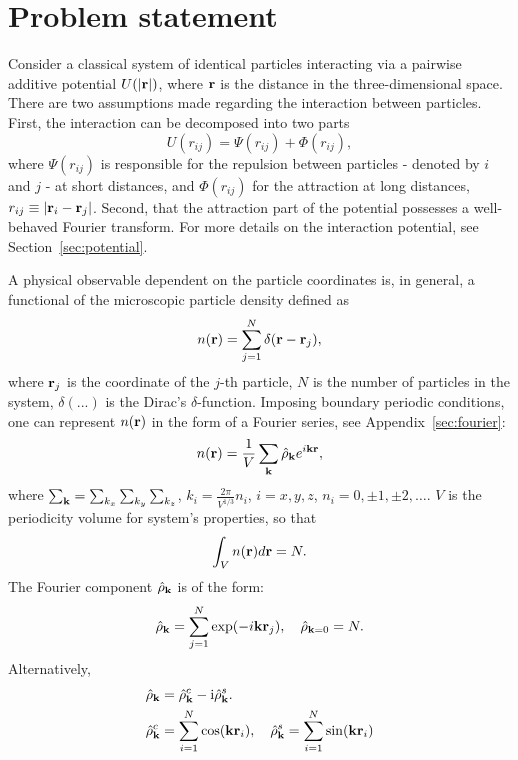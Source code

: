 \section{\label{sec:problem_statement} Problem statement}

Consider a classical system of identical particles interacting via a pairwise additive potential $U(\abs{\vb r})$, where $\vb r$ is the distance in the three-dimensional space. There are two assumptions made regarding the interaction between particles. First, the interaction can be decomposed into two parts
\begin{equation}
	\label{interaction_decomp}
	U(r_{ij}) = \Psi(r_{ij}) + \Phi(r_{ij}),
\end{equation}
where $\Psi(r_{ij})$ is responsible for the repulsion between particles - denoted by $i$ and $j$ -  at short distances, and $\Phi(r_{ij})$ for the attraction at long distances, $r_{ij} \equiv \abs{\vb r_i - \vb r_j}$. Second, that the attraction part of the potential possesses a well-behaved Fourier transform. For more details on the interaction potential, see Section~\ref{sec:potential}.

A physical observable dependent on the particle coordinates is, in general, a functional of the microscopic particle density defined as 
\begin{equation}
	n(\vb r) = \sum_{j=1}^{N} \delta(\vb r - \vb r_j),
\end{equation}
where $\vb r_j$ is the coordinate of the $j$-th particle, $N$ is the number of particles in the system, $\delta(...)$ is the Dirac's $\delta$-function. Imposing boundary periodic conditions, one can represent $n(\vb r)$ in the form of a Fourier series, see Appendix~\ref{sec:fourier}:
\begin{equation}
	n(\vb r) = \frac{1}{V} \sum_{\vb k} \hat{\rho}_{\vb k} e^{i\vb k \vb r},
\end{equation}
where $\sum_{\vb k} = \sum_{k_x}\sum_{k_y}\sum_{k_z}$, $k_i = \frac{2\pi}{V^{1/3}}n_i$, $i=x,y,z$, $n_i=0,\pm 1, \pm 2, \dotsc$. $V$ is the periodicity volume for system's properties, so that
$$ \int_V n(\vb r) d\vb r = N.$$
The Fourier component $\hat{\rho}_{\vb k}$ is of the form:
\begin{equation}
	\label{def:rho_k}
	\hat{\rho}_{\vb k} = \sum_{j=1}^N\exp(-i\vb k \vb r_j), \quad \hat{\rho}_{\vb k = 0} = N. 
\end{equation}
Alternatively, 
\begin{eqnarray}
	\label{rho_k_sin}
	& \hat{\rho}_{\vb k} = \hat{\rho}_{\vb k}^c - {\rm i}\hat{\rho}_{\vb k}^s.
	\nonumber\\
	& \hat{\rho}_{\vb k}^c = \sum_{i=1}^N \cos(\vb k \vb r_i), \quad \hat{\rho}_{\vb k}^s = \sum_{i=1}^N \sin(\vb k \vb r_i)
\end{eqnarray}


